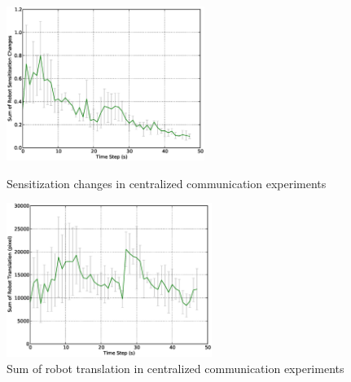 \documentclass{llncs}
\begin{document}
\begin{figure}
\begin{minipage}[t]{0.5\linewidth}
\centering
\includegraphics[height=5cm,  angle=0]
{images/global/RobotSensitizationStat-Total-50steps.eps}
\caption{\small Sensitization changes in centralized communication experiments}
\label{fig:g3} %
\end{minipage}
\hspace{0.5cm}
\begin{minipage}[t]{0.5\linewidth}
\centering
\includegraphics[height=5cm, angle=0]{images/global/DeltaTranslationStat.eps}
\caption{\small Sum of robot translation in centralized communication experiments}
\label{fig:g4} %
\end{minipage}
\end{figure}
\end{document}
